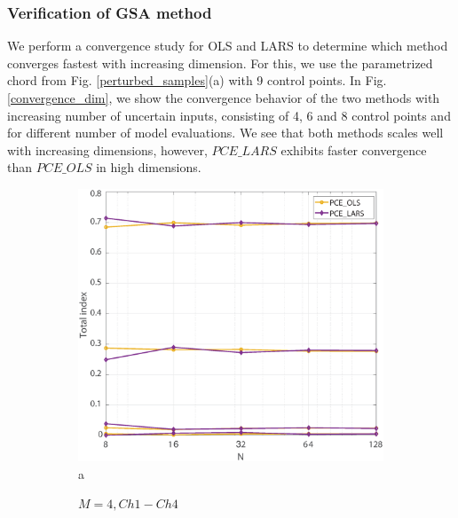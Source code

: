 \documentclass[review]{elsarticle}
\numberwithin{equation}{section}
\numberwithin{equation}{section}
\begin{document}
\subsubsection{Verification of GSA method}
We perform a convergence study for OLS and LARS to determine which method converges fastest with increasing dimension. For this, we use the parametrized chord from Fig. \ref{perturbed_samples}(a) with 9 control points. In Fig. \ref{convergence_dim}, we show the convergence behavior of the two methods with increasing number of uncertain inputs, consisting of 4, 6 and 8 control points and for different number of model evaluations. We see that both methods scales well with increasing dimensions, however, $PCE\_LARS$ exhibits faster convergence than $PCE\_OLS$ in high dimensions.

\begin{figure}[h!]
    \centering
    \begin{subfigure}[t]{0.32\textwidth}
        \centering
        \includegraphics[trim={1cm 0cm 0 0cm}, clip, scale = 0.22]{convergence_chord1_4.eps}{a}
        \caption{$M=4, Ch1-Ch4$}
    \end{subfigure}%
    ~ 
    \begin{subfigure}[t]{0.32\textwidth}
        \centering

\end{subfigure}
\end{figure}
\end{document}
